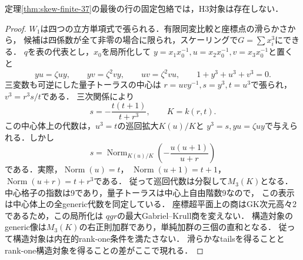 \begin{proposition}
\label{prop:third-six-rank-obstruction}
定理\ref{thm:skew-finite-37}の最後の行の固定包絡では，H3対象は存在しない．
\end{proposition}
\begin{proof}
$W_1$は四つの立方単項式で張られる．有限同変比較と座標点の滑らかさから，
候補は四係数が全て非零の場合に限られ，スケーリングで$G=\sum x_i^3$にできる．
$q$を表の代表とし，$x_0$を局所化して
$y=x_1x_0^{-1},u=x_2x_0^{-1},v=x_3x_0^{-1}$と置くと
\[
 yu=\zeta uy,\qquad yv=\zeta^2vy,\qquad uv=\zeta^2vu,
 \qquad 1+y^3+u^3+v^3=0.
\]
三変数も可逆にした量子トーラスの中心は
$r=uvy^{-1},s=y^3,t=u^3$で張られ，$v^3=r^3s/t$である．
三次関係により
\[
 s=-\frac{t(t+1)}{t+r^3},\qquad K=k(r,t).
\]
この中心体上の代数は，$u^3=t$の巡回拡大$K(u)/K$と
$y^3=s,yu=\zeta uy$で与えられる．しかし
\[
 s=\operatorname{Norm}_{K(u)/K}
       \left(-\frac{u(u+1)}{u+r}\right)
\]
である．実際，$\operatorname{Norm}(u)=t$，
$\operatorname{Norm}(u+1)=t+1$，$\operatorname{Norm}(u+r)=t+r^3$である．
従って巡回代数は分裂して$M_3(K)$となる．
中心格子の指数は9であり，量子トーラスは中心上自由階数9なので，
この表示は中心体上の全generic代数を同定している．
座標超平面上の商はGK次元高々2であるため，この局所化は
$qgr$の最大Gabriel--Krull商を変えない．
構造対象のgeneric像は$M_3(K)$の右正則加群であり，単純加群の三個の直和となる．
従って構造対象は内在的rank-one条件を満たさない．
滑らかなtailsを得ることとrank-one構造対象を得ることの差がここで現れる．
\end{proof}

